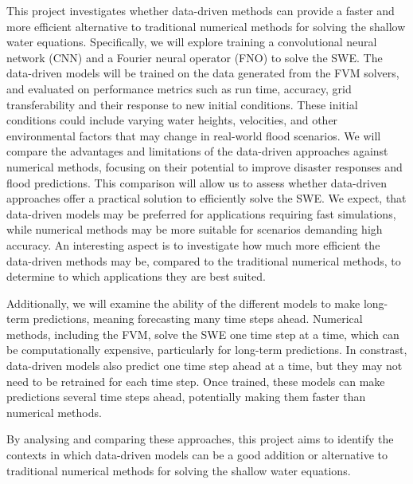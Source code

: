 This project investigates whether data-driven methods can provide a faster and more efficient alternative to traditional numerical methods for solving the shallow water equations.
Specifically, we will explore training a convolutional neural network (CNN) and a Fourier neural operator (FNO) to solve the SWE.
The data-driven models will be trained on the data generated from the FVM solvers, and evaluated on performance metrics such as run time, accuracy, grid transferability and their response to new initial conditions.
These initial conditions could include varying water heights, velocities, and other environmental factors that may change in real-world flood scenarios.
We will compare the advantages and limitations of the data-driven approaches against numerical methods, focusing on their potential to improve disaster responses and flood predictions.
This comparison will allow us to assess whether data-driven approaches offer a practical solution to efficiently solve the SWE.
We expect, that data-driven models may be preferred for applications requiring fast simulations, while numerical methods may be more suitable for scenarios demanding high accuracy.
An interesting aspect is to investigate how much more efficient the data-driven methods may be, compared to the traditional numerical methods, to determine to which applications they are best suited.

Additionally, we will examine the ability of the different models to make long-term predictions, meaning forecasting many time steps ahead.
Numerical methods, including the FVM, solve the SWE one time step at a time, which can be computationally expensive, particularly for long-term predictions.
In constrast, data-driven models also predict one time step ahead at a time, but they may not need to be retrained for each time step.
Once trained, these models can make predictions several time steps ahead, potentially making them faster than numerical methods.

By analysing and comparing these approaches, this project aims to identify the contexts in which data-driven models can be a good addition or alternative to traditional numerical methods for solving the shallow water equations.


